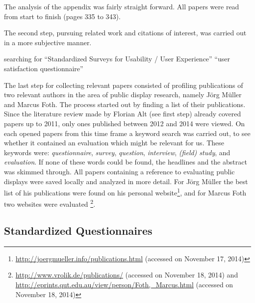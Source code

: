	The analysis of the appendix was fairly straight forward. All papers were read from start to finish (pages 335 to 343). 

	The second step, pursuing related work and citations of interest, was carried out in a more subjective manner.


		searching for ``Standardized Surveys for Usability / User Experience''
		``user satisfaction questionnaire''



	The last step for collecting relevant papers consisted of profiling publications of two relevant authors in the area of public display research, namely J\"org M\"uller and Marcus Foth. The process started out by finding a list of their publications. Since the literature review made by Florian Alt (see first step) already covered papers up to 2011, only ones published between 2012 and 2014 were viewed. 
	On each opened papers from this time frame a keyword search was carried out, to see whether it contained an evaluation which might be relevant for us. These keywords were: \textit{questionnaire}, \textit{survey}, \textit{question}, \textit{interview}, \textit{(field) study}, and \textit{evaluation}. If none of these words could be found, the headlines and the abstract was skimmed through. All papers containing a reference to evaluating public displays were saved locally and analyzed in more detail.
	For J\"org M\"uller the best list of his publications were found on his personal website\footnote{\url{http://joergmueller.info/publications.html} (accessed on November 17, 2014)}, and for Marcus Foth two websites were evaluated \footnote{\url{http://www.vrolik.de/publications/} (accessed on November 18, 2014) and \url{http://eprints.qut.edu.au/view/person/Foth,_Marcus.html} (accessed on November 18, 2014)}. 






\subsection{Standardized Questionnaires}

